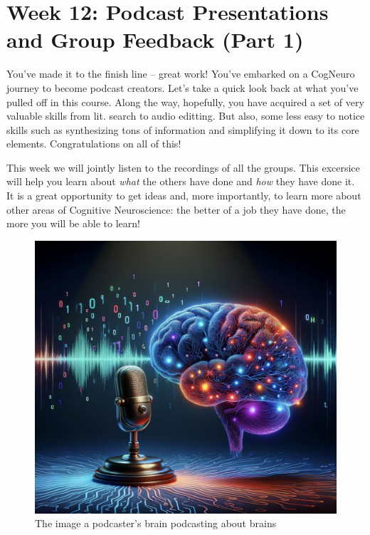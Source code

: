 \documentclass[
  letterpaper,
  DIV=11,
  numbers=noendperiod]{scrreprt}
\begin{document}
\chapter{Week 12: Podcast Presentations and Group Feedback (Part
1)}\label{week-12-podcast-presentations-and-group-feedback-part-1}

You've made it to the finish line -- great work! You've embarked on a
CogNeuro journey to become podcast creators. Let's take a quick look
back at what you've pulled off in this course. Along the way, hopefully,
you have acquired a set of very valuable skills from lit. search to
audio editting. But also, some less easy to notice skills such as
synthesizing tons of information and simplifying it down to its core
elements. Congratulations on all of this!

This week we will jointly listen to the recordings of all the groups.
This excersice will help you learn about \emph{what} the others have
done and \emph{how} they have done it. It is a great opportunity to get
ideas and, more importantly, to learn more about other areas of
Cognitive Neuroscience: the better of a job they have done, the more you
will be able to learn!

\begin{figure}[H]

{\centering \includegraphics{_images/brain_podcast.png}

}

\caption{The image a podcaster's brain podcasting about brains}

\end{figure}%
\end{document}
